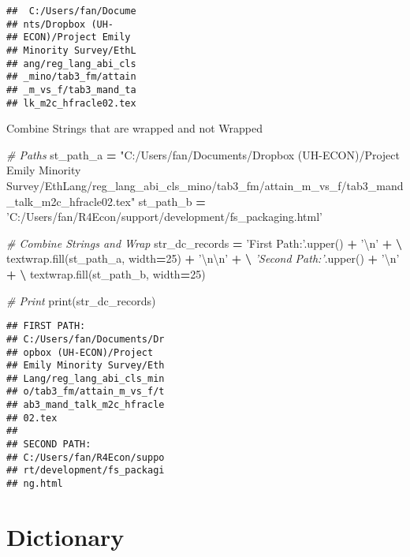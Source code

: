 \documentclass[
]{book}
\newenvironment{Shaded}{\begin{snugshade}}{\end{snugshade}}
\newcommand{\BuiltInTok}[1]{#1}
\newcommand{\CharTok}[1]{\textcolor[rgb]{0.31,0.60,0.02}{#1}}
\newcommand{\CommentTok}[1]{\textcolor[rgb]{0.56,0.35,0.01}{\textit{#1}}}
\newcommand{\DecValTok}[1]{\textcolor[rgb]{0.00,0.00,0.81}{#1}}
\newcommand{\NormalTok}[1]{#1}
\newcommand{\OperatorTok}[1]{\textcolor[rgb]{0.81,0.36,0.00}{\textbf{#1}}}
\newcommand{\StringTok}[1]{\textcolor[rgb]{0.31,0.60,0.02}{#1}}
\begin{document}
\begin{verbatim}
##  C:/Users/fan/Docume
## nts/Dropbox (UH-
## ECON)/Project Emily
## Minority Survey/EthL
## ang/reg_lang_abi_cls
## _mino/tab3_fm/attain
## _m_vs_f/tab3_mand_ta
## lk_m2c_hfracle02.tex
\end{verbatim}

Combine Strings that are wrapped and not Wrapped

\begin{Shaded}
\begin{Highlighting}[]

\CommentTok{# Paths}
\NormalTok{st_path_a }\OperatorTok{=} \StringTok{"C:/Users/fan/Documents/Dropbox (UH-ECON)/Project Emily Minority Survey/EthLang/reg_lang_abi_cls_mino/tab3_fm/attain_m_vs_f/tab3_mand_talk_m2c_hfracle02.tex"}
\NormalTok{st_path_b }\OperatorTok{=} \StringTok{'C:/Users/fan/R4Econ/support/development/fs_packaging.html'}

\CommentTok{# Combine Strings and Wrap}
\NormalTok{str_dc_records }\OperatorTok{=} \StringTok{'First Path:'}\NormalTok{.upper() }\OperatorTok{+} \StringTok{'}\CharTok{\textbackslash{}n}\StringTok{'} \OperatorTok{+} \OperatorTok{\textbackslash{}}
\NormalTok{                 textwrap.fill(st_path_a, width}\OperatorTok{=}\DecValTok{25}\NormalTok{) }\OperatorTok{+} \StringTok{'}\CharTok{\textbackslash{}n\textbackslash{}n}\StringTok{'} \OperatorTok{+} \OperatorTok{\textbackslash{}}
                 \CommentTok{'Second Path:'}\NormalTok{.upper() }\OperatorTok{+} \StringTok{'}\CharTok{\textbackslash{}n}\StringTok{'} \OperatorTok{+} \OperatorTok{\textbackslash{}}
\NormalTok{                 textwrap.fill(st_path_b, width}\OperatorTok{=}\DecValTok{25}\NormalTok{)}
              
\CommentTok{# Print}
\BuiltInTok{print}\NormalTok{(str_dc_records)                 }
\end{Highlighting}
\end{Shaded}

\begin{verbatim}
## FIRST PATH:
## C:/Users/fan/Documents/Dr
## opbox (UH-ECON)/Project
## Emily Minority Survey/Eth
## Lang/reg_lang_abi_cls_min
## o/tab3_fm/attain_m_vs_f/t
## ab3_mand_talk_m2c_hfracle
## 02.tex
## 
## SECOND PATH:
## C:/Users/fan/R4Econ/suppo
## rt/development/fs_packagi
## ng.html
\end{verbatim}

\hypertarget{dictionary}{%
\section{Dictionary}\label{dictionary}}
\end{document}
